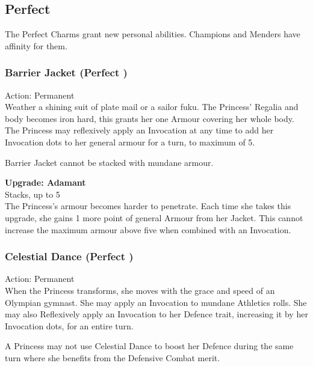 \subsection*{Perfect}
The Perfect Charms grant new personal abilities. Champions and Menders have affinity for them.

\subsubsection*{Barrier Jacket (Perfect \textbullet)}

\noindent Action: Permanent \\

\noindent  Weather a shining suit of plate mail or a sailor fuku. The Princess' Regalia and body becomes iron hard, this grants her one Armour covering her whole body. The Princess may reflexively apply an Invocation at any time to add her Invocation dots to her general armour for a turn, to maximum of 5. 

Barrier Jacket cannot be stacked with mundane armour.

\textbf{Upgrade: Adamant}\\

\noindent Stacks, up to 5 \\

\noindent The Princess's armour becomes harder to penetrate. Each time she takes this upgrade, she gains 1 more point of general Armour from her Jacket. This cannot increase the maximum armour above five when combined with an Invocation. 

\subsubsection*{Celestial Dance (Perfect \textbullet)}

\noindent Action: Permanent \\

\noindent When the Princess transforms, she moves with the grace and speed of an Olympian gymnast. She may apply an Invocation to mundane Athletics rolls. She may also Reflexively apply an Invocation to her Defence trait, increasing it by her Invocation dots, for an entire turn. 

A Princess may not use Celestial Dance to boost her Defence during the same turn where she benefits from the Defensive Combat merit. 

